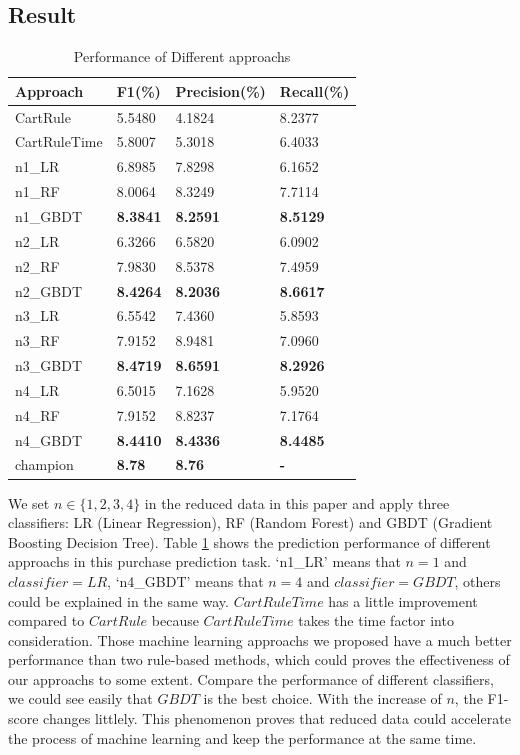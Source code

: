 \documentclass{llncs}
\begin{document}
\subsection{Result}
\begin{table}[htbp]
	\normalsize
	\centering
	\caption{Performance of Different approachs}
	\begin{tabular}{|p{80pt}|p{60pt}|p{60pt}|p{60pt}|}
		\hline
		Approach & F1(\%) & Precision(\%) & Recall(\%) \\
		\hline
		CartRule & 5.5480 & 4.1824 & 8.2377 \\
		CartRuleTime & 5.8007 & 5.3018 & 6.4033 \\
		\hline
		n1\_LR & 6.8985 & 7.8298 & 6.1652 \\
		n1\_RF & 8.0064 & 8.3249 & 7.7114 \\
		n1\_GBDT & \textbf{8.3841} & \textbf{8.2591} & \textbf{8.5129} \\
		\hline
		n2\_LR & 6.3266 & 6.5820 & 6.0902 \\
		n2\_RF & 7.9830 & 8.5378 & 7.4959 \\
		n2\_GBDT & \textbf{8.4264} & \textbf{8.2036} & \textbf{8.6617} \\
		\hline
		n3\_LR & 6.5542 & 7.4360 & 5.8593 \\
		n3\_RF & 7.9152 & 8.9481 & 7.0960 \\
		n3\_GBDT & \textbf{8.4719} & \textbf{8.6591} & \textbf{8.2926} \\
		\hline
		n4\_LR & 6.5015 & 7.1628 & 5.9520 \\
		n4\_RF & 7.9152 & 8.8237 & 7.1764 \\
		n4\_GBDT & \textbf{8.4410} & \textbf{8.4336} & \textbf{8.4485} \\
		\hline
		champion & \textbf{8.78} & \textbf{8.76} & \textbf{-} \\
		\hline
	\end{tabular}
	\label{tab:score}
\end{table}

We set $n \in \{ 1, 2, 3, 4\}$ in the reduced data in this paper
and apply three classifiers: LR (Linear Regression), RF (Random Forest) and GBDT (Gradient Boosting Decision Tree).
Table \ref{tab:score} shows the prediction performance of different approachs
in this purchase prediction task.
`n1\_LR' means that $n = 1$ and $classifier = LR$,
`n4\_GBDT' means that $n = 4$ and $classifier = GBDT$,
others could be explained in the same way.
$CartRuleTime$ has a little improvement compared to $CartRule$
because $CartRuleTime$ takes the time factor into consideration.
Those machine learning approachs we proposed have a much better performance
than two rule-based methods, which could proves the effectiveness of our approachs to some extent.
Compare the performance of different classifiers,
we could see easily that $GBDT$ is the best choice.
With the increase of $n$, the F1-score changes littlely.
This phenomenon proves that reduced data could accelerate
the process of machine learning and keep the performance at the same time.
\end{document}
